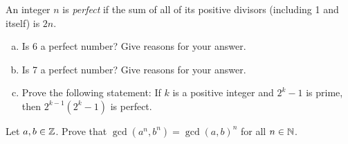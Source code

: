 \documentclass{agony}
\begin{document}
\question An integer $n$ is \emph{perfect} if the sum of all of its positive divisors
(including 1 and itself) is $2n$.
\begin{enumerate}[(a)]
  \item Is 6 a perfect number? Give reasons for your answer.
  \item Is 7 a perfect number? Give reasons for your answer.
  \item Prove the following statement:
        If $k$ is a positive integer and $2^k-1$ is prime, then $2^{k-1}(2^k-1)$ is perfect.
\end{enumerate}

\question Let $a,b\in\mathbb{Z}$. Prove that $\gcd(a^n, b^n) = \gcd(a, b)^n$ for all $n\in\mathbb{N}$.
\end{document}
